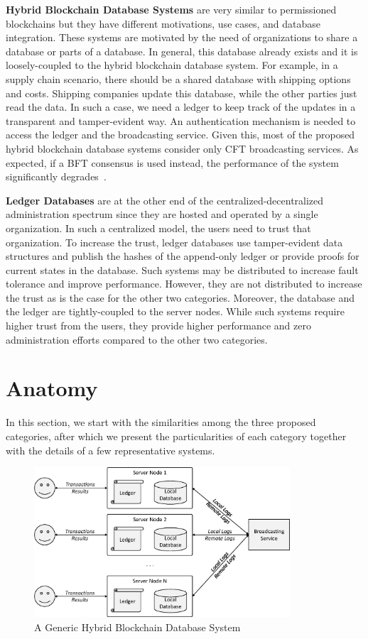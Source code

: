 \documentclass[11pt]{article}
\begin{document}
\textbf{Hybrid Blockchain Database Systems} are very similar to permissioned blockchains but they have different motivations, use cases, and database integration. These systems are motivated by the need of organizations to share a database or parts of a database. In general, this database already exists and it is loosely-coupled to the hybrid blockchain database system. For example, in a supply chain scenario, there should be a shared database with shipping options and costs. Shipping companies update this database, while the other parties just read the data. In such a case, we need a ledger to keep track of the updates in a transparent and tamper-evident way. An authentication mechanism is needed to access the ledger and the broadcasting service. Given this, most of the proposed hybrid blockchain database systems consider only CFT broadcasting services. As expected, if a BFT consensus is used instead, the performance of the system significantly degrades~\cite{loghin_vldb2022}.

\textbf{Ledger Databases} are at the other end of the centralized-decentralized administration spectrum since they are hosted and operated by a single organization. In such a centralized model, the users need to trust that organization. To increase the trust, ledger databases use tamper-evident data structures and publish the hashes of the append-only ledger or provide proofs for current states in the database. Such systems may be distributed to increase fault tolerance and improve performance. However, they are not distributed to increase the trust as is the case for the other two categories. Moreover, the database and the ledger are tightly-coupled to the server nodes. While such systems require higher trust from the users, they provide higher performance and zero administration efforts compared to the other two categories.


\section{Anatomy}
\label{sec:anatomy}

In this section, we start with the similarities among the three proposed categories, after which we present the particularities of each category together with the details of a few representative systems.

\begin{figure}[tp]
	\centering    
	\includegraphics[width=0.85\textwidth]{figs/veritas-digram.eps}
	\caption{A Generic Hybrid Blockchain Database System}
    \label{fig:hbdb}    
\end{figure}
\end{document}
